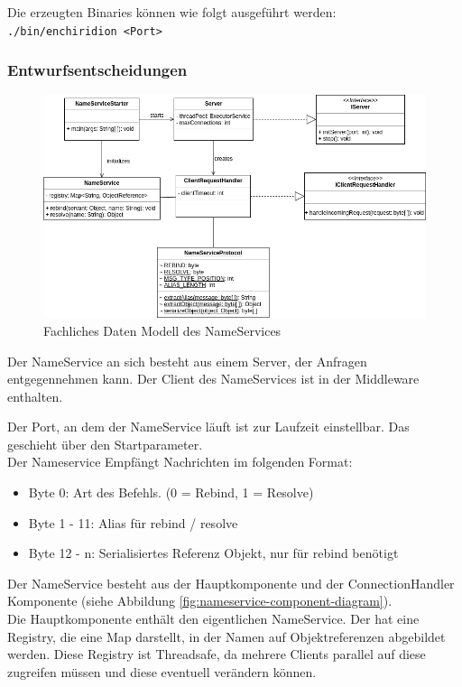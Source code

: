 \documentclass{article}
\begin{document}
Die erzeugten Binaries können wie folgt ausgeführt werden:\\

\texttt{./bin/enchiridion <Port>}

\subsubsection{Entwurfsentscheidungen}
\begin{figure}[H]
    \centering
    \includegraphics[width=\textwidth]{nameservice-fdm.png}
    \caption[fdm-nameservice]{Fachliches Daten Modell des NameServices}
    \label{fig:fdm-nameservice}
\end{figure}

Der NameService an sich besteht aus einem Server, der Anfragen entgegennehmen kann.
Der Client des NameServices ist in der Middleware enthalten.

Der Port, an dem der NameService läuft ist zur Laufzeit einstellbar. Das geschieht über den Startparameter.\\

Der Nameservice Empfängt Nachrichten im folgenden Format:
\begin{itemize}
\item Byte 0: Art des Befehls. (0 = Rebind, 1 = Resolve)
\item Byte 1 - 11: Alias für rebind / resolve
\item Byte 12 - n: Serialisiertes Referenz Objekt, nur für rebind benötigt
\end{itemize}

Der NameService besteht aus der Hauptkomponente und der ConnectionHandler Komponente (siehe Abbildung
\ref{fig:nameservice-component-diagram}).\\

Die Hauptkomponente enthält den eigentlichen NameService. Der hat eine Registry, die eine Map darstellt, in der Namen
auf Objektreferenzen abgebildet werden. Diese Registry ist Threadsafe, da mehrere Clients parallel auf diese
zugreifen müssen und diese eventuell verändern können.
\end{document}
